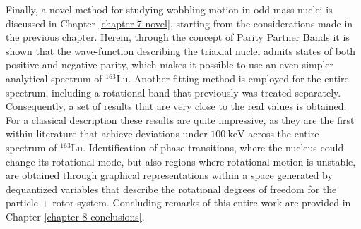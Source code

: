 Finally, a novel method for studying wobbling motion in odd-mass nuclei is discussed in Chapter \ref{chapter-7-novel}, starting from the considerations made in the previous chapter. Herein, through the concept of Parity Partner Bands it is shown that the wave-function describing the triaxial nuclei admits states of both positive and negative parity, which makes it possible to use an even simpler analytical spectrum of $^{163}$Lu. Another fitting method is employed for the entire spectrum, including a rotational band that previously was treated separately. Consequently, a set of results that are very close to the real values is obtained. For a classical description these results are quite impressive, as they are the first within literature that achieve deviations under $100\ \text{keV}$ across the entire spectrum of $^{163}$Lu. Identification of phase transitions, where the nucleus could change its rotational mode, but also regions where rotational motion is unstable, are obtained through graphical representations within a space generated by dequantized variables that describe the rotational degrees of freedom for the particle + rotor system. Concluding remarks of this entire work are provided in Chapter \ref{chapter-8-conclusions}.